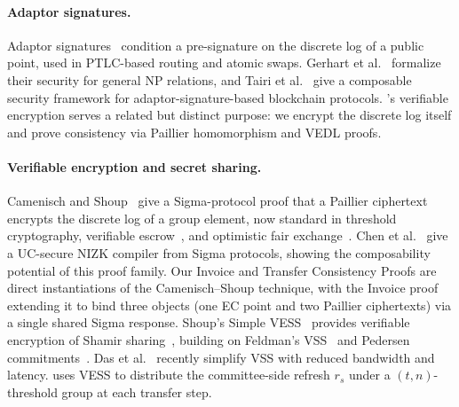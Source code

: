 \paragraph{Adaptor signatures.}
Adaptor signatures~\cite{aumayr2021generalized, erwig2021two} condition a pre-signature on the discrete log of a public point, used in PTLC-based routing and atomic swaps. Gerhart et al.~\cite{thyagarajan2024foundations} formalize their security for general NP relations, and Tairi et al.~\cite{tairi2023ledgerlocks} give a composable security framework for adaptor-signature-based blockchain protocols. \thunderbolt's verifiable encryption serves a related but distinct purpose: we encrypt the discrete log itself and prove consistency via Paillier homomorphism and VEDL proofs.

\paragraph{Verifiable encryption and secret sharing.}
Camenisch and Shoup~\cite{camenisch2003verifiable} give a Sigma-protocol proof that a Paillier ciphertext encrypts the discrete log of a group element, now standard in threshold cryptography, verifiable escrow~\cite{camenisch2000verifiable}, and optimistic fair exchange~\cite{asokan1998optimistic}. Chen et al.~\cite{chen2025ucnizk} give a UC-secure NIZK compiler from Sigma protocols, showing the composability potential of this proof family. Our Invoice and Transfer Consistency Proofs are direct instantiations of the Camenisch--Shoup technique, with the Invoice proof extending it to bind three objects (one EC point and two Paillier ciphertexts) via a single shared Sigma response. Shoup's Simple VESS~\cite{shoup2024simple} provides verifiable encryption of Shamir sharing~\cite{shamir1979share}, building on Feldman's VSS~\cite{feldman1987practical} and Pedersen commitments~\cite{pedersen1991non}. Das et al.~\cite{das2025vss} recently simplify VSS with reduced bandwidth and latency. \thunderbolt uses VESS to distribute the committee-side refresh $r_s$ under a $(t,n)$-threshold group at each transfer step.

